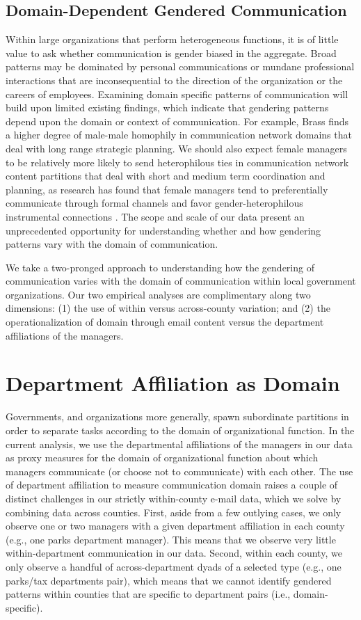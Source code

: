 \documentclass{pnastwo}
\begin{document}
\begin{article}
\subsection{Domain-Dependent Gendered Communication}
Within large organizations that perform heterogeneous functions, it is of little value to ask whether communication is gender biased in the aggregate. Broad patterns may be dominated by personal communications or mundane professional interactions that are inconsequential to the direction of the organization or the careers of employees. Examining domain specific patterns of communication will build upon limited existing findings, which indicate that gendering patterns depend upon the domain or context of communication. For example, Brass \citep{Brass1985} finds a higher degree of male-male homophily in communication network domains that deal with long range strategic planning. We should also expect female managers to be relatively more likely to send heterophilous ties in communication network content partitions that deal with short and medium term coordination and planning, as research has found that female managers tend to preferentially communicate through formal channels  \citep{Ragins1989} and favor gender-heterophilous instrumental connections \citep{Ibarra1992}. The scope and scale of our data present an unprecedented opportunity for understanding whether and how gendering patterns vary with the domain of communication.

We take a two-pronged approach to understanding how the gendering of communication varies with the domain of communication within local government organizations. Our two empirical analyses are complimentary along two dimensions: (1) the use of within versus across-county variation; and (2) the operationalization of domain through email content versus the department affiliations of the managers. 

\section{Department Affiliation as Domain}

Governments, and organizations more generally, spawn subordinate partitions in order to separate tasks according to the domain of organizational function. In the current analysis, we use the departmental affiliations of the managers in our data as proxy measures for the domain of organizational function about which managers communicate (or choose not to communicate) with each other. The use of department affiliation to measure communication domain raises a couple of distinct challenges in our strictly within-county e-mail data, which we solve by combining data across counties. First, aside from a few outlying cases, we only observe one or two managers with a given department affiliation in each county (e.g., one parks department manager). This means that we observe very little within-department communication in our data. Second, within each county, we only observe a handful of across-department dyads of a selected type (e.g., one parks/tax departments pair), which means that we cannot identify gendered patterns within counties that are specific to department pairs (i.e., domain-specific).


\end{article}
\end{document}
